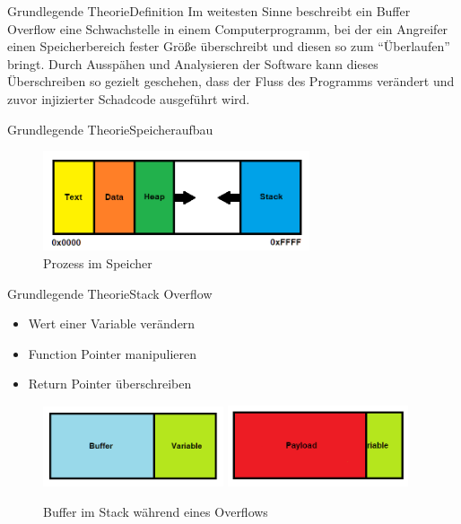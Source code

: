 \pagebreak
\begin{frame}{Grundlegende Theorie}{Definition}
    Im weitesten Sinne beschreibt ein Buffer Overflow eine Schwachstelle in einem Computerprogramm,
    bei der ein Angreifer einen Speicherbereich fester Größe überschreibt und diesen so zum “Überlaufen” bringt.
    Durch Ausspähen und Analysieren der Software kann dieses Überschreiben so gezielt geschehen, dass der Fluss des
    Programms verändert und zuvor injizierter Schadcode ausgeführt wird.    
\end{frame}


\begin{frame}{Grundlegende Theorie}{Speicheraufbau}
    \begin{figure}[h]
        \centering
        \includegraphics[width=0.7\textwidth,height=0.75\textheight,keepaspectratio]{images/process.png}
        \caption{Prozess im Speicher}
    \end{figure}
\end{frame}

\begin{frame}{Grundlegende Theorie}{Stack Overflow}
    \begin{itemize}
        \setlength{\itemindent}{19em}
        \item Wert einer Variable verändern
        \item Function Pointer manipulieren
        \item Return Pointer überschreiben        
    \end{itemize}
    \begin{figure}[h]
        \includegraphics[width=0.475\textwidth]{images/buffer1.png}
        \hfill
        \includegraphics[width=0.475\textwidth]{images/buffer2.png}
        \caption{Buffer im Stack während eines Overflows}
    \end{figure}
\end{frame}






